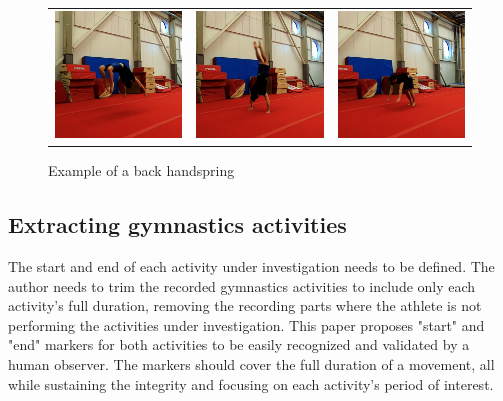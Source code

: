 \begin{figure}
\begin{tabular}{ccc}
\includegraphics[width=5cm]{images/data-acquisition/example-flack-part-4}&
\includegraphics[width=5cm]{images/data-acquisition/example-flack-part-5}&
\includegraphics[width=5cm]{images/data-acquisition/example-flack-part-6}\\
\end{tabular}
    \caption{Example of a back handspring}
    \label{example-of-back-handspring}
\end{figure}

\subsection{Extracting gymnastics activities}

The start and end of each activity under investigation needs to be defined. The author needs to trim the recorded gymnastics activities to include only each activity's full duration, removing the recording parts where the athlete is not performing the activities under investigation. This paper proposes "start" and "end" markers for both activities to be easily recognized and validated by a human observer. The markers should cover the full duration of a movement, all while sustaining the integrity and focusing on each activity's period of interest.

